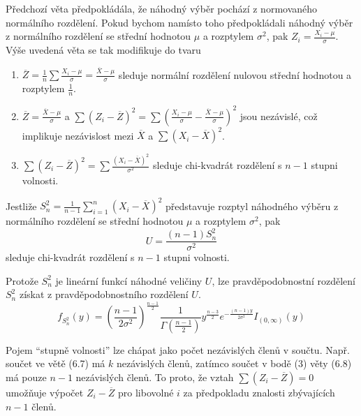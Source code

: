 \begin{theorem}
Předchozí věta předpokládála, že náhodný výběr pochází z normovaného normálního rozdělení. Pokud bychom namísto toho předpokládali náhodný výběr z normálního rozdělení se střední hodnotou $\mu$ a rozptylem $\sigma^2$, pak $Z_i = \frac{X_i - \mu}{\sigma}$. Výše uvedená věta se tak modifikuje do tvaru
\begin{enumerate}
\item $\overline{Z} = \frac{1}{n}\sum \frac{X_i - \mu}{\sigma} = \frac{\overline{X} - \mu}{\sigma}$ sleduje normální rozdělení nulovou střední hodnotou a rozptylem $\frac{1}{n}$.
\item $\overline{Z} = \frac{\overline{X} - \mu}{\sigma}$ a $\sum (Z_i - \overline{Z})^2 = \sum \left(\frac{X_i - \mu}{\sigma} - \frac{\overline{X} - \mu}{\sigma}\right)^2$ jsou nezávislé, což implikuje nezávislost mezi $\overline{X}$ a $\sum(X_i - \overline{X})^2$.
\item $\sum (Z_i - \overline{Z})^2 = \sum \frac{(X_i - \overline{X})^2}{\sigma^2}$ sleduje chi-kvadrát rozdělení s $n - 1$ stupni volnosti.
\end{enumerate}
\end{theorem}

\begin{corollary}
Jestliže $S_n^2 = \frac{1}{n - 1}\sum_{i = 1}^n(X_i - \overline{X})^2$ představuje rozptyl náhodného výběru z normálního rozdělení se střední hodnotou $\mu$ a rozptylem $\sigma^2$, pak
\begin{equation*}
U = \frac{(n - 1) S_n^2}{\sigma^2}
\end{equation*}
sleduje chi-kvadrát rozdělení s $n - 1$ stupni volnosti.
\end{corollary}
Protože $S_n^2$ je lineární funkcí náhodné veličiny $U$, lze pravděpodobnostní rozdělení $S_n^2$ získat z pravděpodobnostního rozdělení $U$.
\begin{equation*}
f_{S_n^2}(y) = \left(\frac{n - 1}{2 \sigma^2}\right)^{\frac{n - 1}{2}} \frac{1}{\Gamma \left(\frac{n - 1}{2}\right)}y^{\frac{n - 3}{2}}e^{-\frac{(n - 1)y}{2 \sigma^2}}I_{(0, \infty)}(y)
\end{equation*}

Pojem ``stupně volnosti'' lze chápat jako počet nezávislých členů v součtu. Např. součet ve větě (6.7) má $k$ nezávislých členů, zatímco součet v bodě (3) věty (6.8) má pouze $n - 1$ nezávislých členů. To proto, že vztah $\sum(Z_i - \overline{Z}) = 0$ umožňuje výpočet $Z_i - \overline{Z}$ pro libovolné $i$ za předpokladu znalosti zbývajících $n - 1$ členů.

